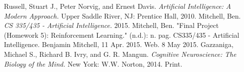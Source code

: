 \documentclass[12pt, letter]{article}
\begin{document}
\begin{thebibliography}{1}
 Russell, Stuart J., Peter Norvig, and Ernest Davis. {\em Artificial Intelligence: A Modern Approach.}  Upper Saddle River, NJ: Prentice Hall, 2010.
 Mitchell, Ben. {\em CS 335/435 - Artificial Intelligence.} 2015.
 Mitchell, Ben. "Final Project (Homework 5): Reinforcement Learning." (n.d.): n. pag. CS335/435 - Artificial Intelligence. Benjamin Mitchell, 11 Apr. 2015. Web. 8 May 2015.
 Gazzaniga, Michael S., Richard B. Ivry, and G. R. Mangun. {\em Cognitive Neuroscience: The Biology of the Mind.} New York: W.W. Norton, 2014. Print.
\end{thebibliography}
\end{document}
